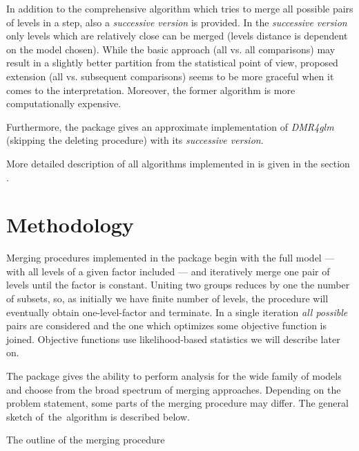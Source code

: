 In addition to the comprehensive algorithm which tries to merge all possible pairs of levels in a step, also a \emph{successive version} is provided. In the \emph{successive version} only levels which are relatively close can be merged (levels distance is dependent on the model chosen). While the basic approach (all vs. all comparisons) may result in a slightly better partition from the statistical point of view, proposed extension (all vs. subsequent comparisons) seems to be more graceful when it comes to the interpretation. Moreover, the former algorithm is more computationally expensive.

Furthermore, the \factorMerger package gives an approximate implementation of \emph{DMR4glm} (skipping the deleting procedure) with its \emph{successive version}.

More detailed description of all algorithms implemented in \factorMerger is given in the section .

\section{Methodology}\label{algs}

Merging procedures implemented in the \factorMerger package begin with the full model --- with all levels of a given factor included --- and iteratively merge one pair of levels until the factor is constant. Uniting two groups reduces by one the number of subsets, so, as initially we have finite number of levels, the procedure will eventually obtain one-level-factor and terminate. In a single iteration \emph{all possible} pairs are considered and the one which optimizes some objective function is joined. Objective functions use likelihood-based statistics we will describe later on. 

The \factorMerger package gives the ability to perform analysis for the wide family of models and choose from the broad spectrum of merging approaches. Depending on the problem statement, some parts of the merging procedure may differ. The general sketch of~the~algorithm is described below.

\begin{algorithm}[H]
\caption{The outline of the merging procedure}
\begin{algorithmic}[2]

\EndWhile
    \EndFunction
\end{algorithmic}
\end{algorithm}

